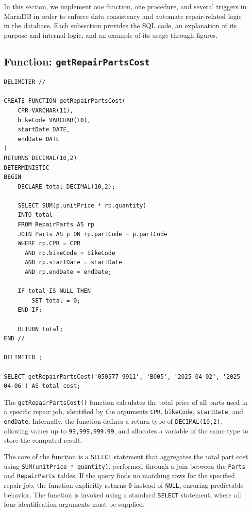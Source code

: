 \documentclass[dtu]{dtuarticle}
\begin{document}
In this section, we implement one function, one procedure, and several triggers in MariaDB in order to enforce data consistency and automate repair-related logic in the database. Each subsection provides the SQL code, an explanation of its purpose and internal logic, and an example of its usage through figures.

\subsection{Function: \texttt{getRepairPartsCost}}

\begin{lstlisting}[style=sql, caption={Definition of the getRepairPartsCost() function}, label={lst:getRepairPartsCost}]
DELIMITER //

CREATE FUNCTION getRepairPartsCost(
    CPR VARCHAR(11),
    bikeCode VARCHAR(10),
    startDate DATE,
    endDate DATE
)
RETURNS DECIMAL(10,2)
DETERMINISTIC
BEGIN
    DECLARE total DECIMAL(10,2);

    SELECT SUM(p.unitPrice * rp.quantity)
    INTO total
    FROM RepairParts AS rp
    JOIN Parts AS p ON rp.partCode = p.partCode
    WHERE rp.CPR = CPR
      AND rp.bikeCode = bikeCode
      AND rp.startDate = startDate
      AND rp.endDate = endDate;

    IF total IS NULL THEN
        SET total = 0;
    END IF;

    RETURN total;
END //

DELIMITER ;

SELECT getRepairPartsCost('050577-9911', 'B005', '2025-04-02', '2025-04-06') AS total_cost;
\end{lstlisting}

The \texttt{getRepairPartsCost()} function calculates the total price of all parts used in a specific repair job, identified by the arguments \texttt{CPR}, \texttt{bikeCode}, \texttt{startDate}, and \texttt{endDate}. Internally, the function defines a return type of \texttt{DECIMAL(10,2)}, allowing values up to \texttt{99,999,999.99}, and allocates a variable of the same type to store the computed result.


The core of the function is a \texttt{SELECT} statement that aggregates the total part cost using \texttt{SUM(unitPrice * quantity)}, performed through a join between the \texttt{Parts} and \texttt{RepairParts} tables. If the query finds no matching rows for the specified repair job, the function explicitly returns \texttt{0} instead of \texttt{NULL}, ensuring predictable behavior. The function is invoked using a standard \texttt{SELECT} statement, where all four identification arguments must be supplied.
\end{document}

